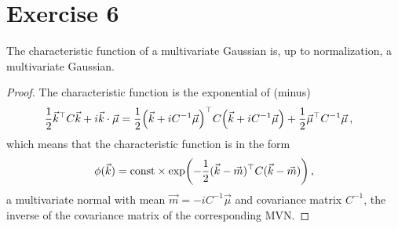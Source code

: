\documentclass[main.tex]{subfiles}
\begin{document}
\section{Exercise 6}

\begin{claim}
The characteristic function of a multivariate Gaussian is, up to normalization, a multivariate Gaussian. 
\end{claim}

\begin{proof}
The characteristic function is the exponential of (minus) 
%
\begin{align}
\frac{1}{2} \vec{k}^{\top} C \vec{k} + i \vec{k} \cdot \vec{\mu} 
&=  \frac{1}{2} \qty(\vec{k} + i C^{-1} \vec{\mu })^{\top} C 
\qty(\vec{k} + iC^{-1}\vec{\mu }) + \frac{1}{2} \vec{\mu }^{\top} C^{-1} \vec{\mu }  
\,,
\end{align}
%
which means that the characteristic function is in the form 
%
\begin{align}
\phi (\vec{k}) = \text{const} \times \exp(- \frac{1}{2} (\vec{k} -\vec{m})^{\top} C (\vec{k} - \vec{m}) )
\,,
\end{align}
%
a multivariate normal with mean \(\vec{m} = -i C^{-1} \vec{\mu}\) and covariance matrix \(C^{-1}\), the inverse of the covariance matrix of the corresponding MVN.  
\end{proof}
\end{document}
